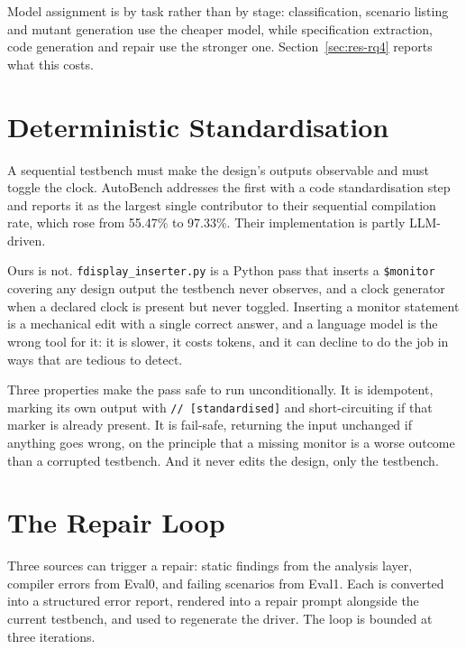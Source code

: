 \documentclass[11pt,a4paper,titlepage=false]{scrreprt}
\begin{document}
Model assignment is by task rather than by stage: classification, scenario listing and
mutant generation use the cheaper model, while specification extraction, code generation
and repair use the stronger one. Section~\ref{sec:res-rq4} reports what this costs.

\section{Deterministic Standardisation}\label{sec:design-standardiser}

A sequential testbench must make the design's outputs observable and must toggle the clock.
AutoBench addresses the first with a code standardisation step and reports it as the
largest single contributor to their sequential compilation rate, which rose from 55.47\% to
97.33\%. Their implementation is partly LLM-driven.

Ours is not. \texttt{fdisplay\_inserter.py} is a Python pass that inserts a
\texttt{\$monitor} covering any design output the testbench never observes, and a clock
generator when a declared clock is present but never toggled. Inserting a monitor statement
is a mechanical edit with a single correct answer, and a language model is the wrong tool
for it: it is slower, it costs tokens, and it can decline to do the job in ways that are
tedious to detect.

Three properties make the pass safe to run unconditionally. It is idempotent, marking its
own output with \verb|// [standardised]| and short-circuiting if that marker is already
present. It is fail-safe, returning the input unchanged if anything goes wrong, on the
principle that a missing monitor is a worse outcome than a corrupted testbench. And it
never edits the design, only the testbench.

\section{The Repair Loop}\label{sec:design-repair}

Three sources can trigger a repair: static findings from the analysis layer, compiler
errors from Eval0, and failing scenarios from Eval1. Each is converted into a structured
error report, rendered into a repair prompt alongside the current testbench, and used to
regenerate the driver. The loop is bounded at three iterations.
\end{document}
